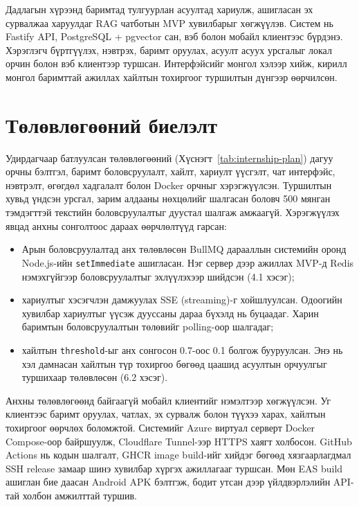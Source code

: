 \documentclass[../main.tex]{subfiles}
\begin{document}
Дадлагын хүрээнд баримтад тулгуурлан асуултад хариулж, ашигласан эх
сурвалжаа харуулдаг RAG чатботын MVP хувилбарыг хөгжүүлэв. Систем нь
Fastify API, PostgreSQL + pgvector сан, вэб болон мобайл клиентээс
бүрдэнэ. Хэрэглэгч бүртгүүлэх, нэвтрэх, баримт оруулах, асуулт асуух
урсгалыг локал орчин болон вэб клиентээр туршсан. Интерфэйсийг монгол
хэлээр хийж, кирилл монгол баримттай ажиллах хайлтын тохиргоог туршилтын
дүнгээр өөрчилсөн.

\section*{Төлөвлөгөөний биелэлт}

Удирдагчаар батлуулсан төлөвлөгөөний (Хүснэгт~\ref{tab:internship-plan})
дагуу орчны бэлтгэл, баримт боловсруулалт, хайлт, хариулт үүсгэлт, чат
интерфэйс, нэвтрэлт, өгөгдөл хадгалалт болон Docker орчныг хэрэгжүүлсэн.
Туршилтын хувьд үндсэн урсгал, зарим алдааны нөхцөлийг шалгасан боловч
500 мянган тэмдэгттэй текстийн боловсруулалтыг дуустал шалгаж амжаагүй.
Хэрэгжүүлэх явцад анхны сонголтоос дараах өөрчлөлтүүд гарсан:

\begin{itemize}
\item Арын боловсруулалтад анх төлөвлөсөн BullMQ дарааллын системийн оронд
Node.js-ийн \texttt{setImmediate} ашигласан. Нэг сервер дээр ажиллах
MVP-д Redis нэмэхгүйгээр боловсруулалтыг эхлүүлэхээр шийдсэн (4.1 хэсэг);
\item хариултыг хэсэгчлэн дамжуулах SSE (streaming)-г хойшлуулсан.
Одоогийн хувилбар хариултыг үүсэж дууссаны дараа бүхэлд нь буцаадаг.
Харин баримтын боловсруулалтын төлөвийг polling-оор шалгадаг;
\item хайлтын \texttt{threshold}-ыг анх сонгосон 0.7-оос 0.1 болгож
бууруулсан. Энэ нь хэл дамнасан хайлтын түр тохиргоо бөгөөд цаашид
асуултын орчуулгыг туршихаар төлөвлөсөн (6.2 хэсэг).
\end{itemize}

Анхны төлөвлөгөөнд байгаагүй мобайл клиентийг нэмэлтээр хөгжүүлсэн.
Уг клиентээс баримт оруулах, чатлах, эх сурвалж болон түүхээ харах,
хайлтын тохиргоог өөрчлөх боломжтой. Системийг Azure виртуал серверт
Docker Compose-оор байршуулж, Cloudflare Tunnel-ээр HTTPS хаягт холбосон.
GitHub Actions нь кодын шалгалт, GHCR image build-ийг хийдэг бөгөөд
хязгаарлагдмал SSH release замаар шинэ хувилбар хүргэх ажиллагааг туршсан.
Мөн EAS build ашиглан бие даасан Android APK бэлтгэж, бодит утсан дээр
үйлдвэрлэлийн API-тай холбон амжилттай туршив.
\end{document}
